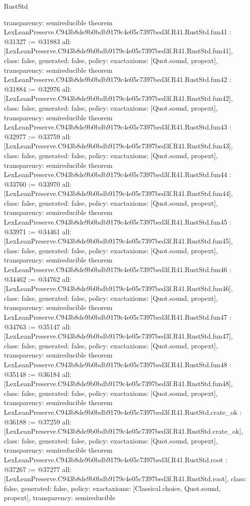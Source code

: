 \begin{lexlean}{RustStd}
\begin{coremodule}
{  transparency: semireducible
}
theorem LexLeanPreserve.C943b8de9b0bdb9179c4e05c7397bed3f.R41.RustStd.fun41 : @31327 := @31883 {
  all: [LexLeanPreserve.C943b8de9b0bdb9179c4e05c7397bed3f.R41.RustStd.fun41],
  class: false,
  generated: false,
  policy: exact{axioms: [Quot.sound, propext]},
  transparency: semireducible
}
theorem LexLeanPreserve.C943b8de9b0bdb9179c4e05c7397bed3f.R41.RustStd.fun42 : @31884 := @32976 {
  all: [LexLeanPreserve.C943b8de9b0bdb9179c4e05c7397bed3f.R41.RustStd.fun42],
  class: false,
  generated: false,
  policy: exact{axioms: [Quot.sound, propext]},
  transparency: semireducible
}
theorem LexLeanPreserve.C943b8de9b0bdb9179c4e05c7397bed3f.R41.RustStd.fun43 : @32977 := @33759 {
  all: [LexLeanPreserve.C943b8de9b0bdb9179c4e05c7397bed3f.R41.RustStd.fun43],
  class: false,
  generated: false,
  policy: exact{axioms: [Quot.sound, propext]},
  transparency: semireducible
}
theorem LexLeanPreserve.C943b8de9b0bdb9179c4e05c7397bed3f.R41.RustStd.fun44 : @33760 := @33970 {
  all: [LexLeanPreserve.C943b8de9b0bdb9179c4e05c7397bed3f.R41.RustStd.fun44],
  class: false,
  generated: false,
  policy: exact{axioms: [Quot.sound, propext]},
  transparency: semireducible
}
theorem LexLeanPreserve.C943b8de9b0bdb9179c4e05c7397bed3f.R41.RustStd.fun45 : @33971 := @34461 {
  all: [LexLeanPreserve.C943b8de9b0bdb9179c4e05c7397bed3f.R41.RustStd.fun45],
  class: false,
  generated: false,
  policy: exact{axioms: [Quot.sound, propext]},
  transparency: semireducible
}
theorem LexLeanPreserve.C943b8de9b0bdb9179c4e05c7397bed3f.R41.RustStd.fun46 : @34462 := @34762 {
  all: [LexLeanPreserve.C943b8de9b0bdb9179c4e05c7397bed3f.R41.RustStd.fun46],
  class: false,
  generated: false,
  policy: exact{axioms: [Quot.sound, propext]},
  transparency: semireducible
}
theorem LexLeanPreserve.C943b8de9b0bdb9179c4e05c7397bed3f.R41.RustStd.fun47 : @34763 := @35147 {
  all: [LexLeanPreserve.C943b8de9b0bdb9179c4e05c7397bed3f.R41.RustStd.fun47],
  class: false,
  generated: false,
  policy: exact{axioms: [Quot.sound, propext]},
  transparency: semireducible
}
theorem LexLeanPreserve.C943b8de9b0bdb9179c4e05c7397bed3f.R41.RustStd.fun48 : @35148 := @36184 {
  all: [LexLeanPreserve.C943b8de9b0bdb9179c4e05c7397bed3f.R41.RustStd.fun48],
  class: false,
  generated: false,
  policy: exact{axioms: [Quot.sound, propext]},
  transparency: semireducible
}
theorem LexLeanPreserve.C943b8de9b0bdb9179c4e05c7397bed3f.R41.RustStd.crate_ok : @36188 := @37259 {
  all: [LexLeanPreserve.C943b8de9b0bdb9179c4e05c7397bed3f.R41.RustStd.crate_ok],
  class: false,
  generated: false,
  policy: exact{axioms: [Quot.sound, propext]},
  transparency: semireducible
}
theorem LexLeanPreserve.C943b8de9b0bdb9179c4e05c7397bed3f.R41.RustStd.root : @37267 := @37277 {
  all: [LexLeanPreserve.C943b8de9b0bdb9179c4e05c7397bed3f.R41.RustStd.root],
  class: false,
  generated: false,
  policy: exact{axioms: [Classical.choice, Quot.sound, propext]},
  transparency: semireducible
}


\end{coremodule}
\end{lexlean}
